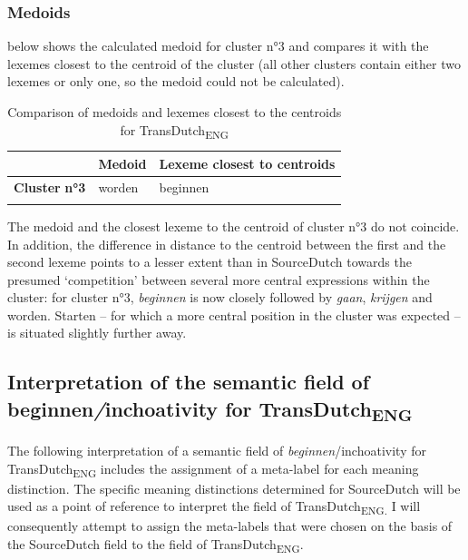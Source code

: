 \subsubsection{Medoids}
\label{sec:4.3.3.2}  
 below shows the calculated medoid for cluster n°3 and compares it with the lexemes closest to the centroid of the cluster (all other clusters contain either two lexemes or only one, so the medoid could not be calculated).

\begin{table}
\caption{\label{tab:4:15} Comparison of medoids and lexemes closest to the centroids for TransDutch\textsubscript{ENG}}
\begin{tabularx}{\textwidth}{XXl} 
\lsptoprule
& \textbf{Medoid} & \textbf{Lexeme} \textbf{closest} \textbf{to} \textbf{centroids}\\
\midrule
\textbf{Cluster} \textbf{n°3} & worden & beginnen\\
\lspbottomrule
\end{tabularx}
\end{table}

The medoid and the closest lexeme to the centroid of cluster n°3 do not coincide. In addition, the difference in distance to the centroid between the first and the second lexeme points to a lesser extent than in SourceDutch towards the presumed ‘competition’ between several more central expressions within the cluster: for cluster n°3, \textit{beginnen} is now closely followed by \textit{gaan}, \textit{krijgen} and worden. Starten – for which a more central position in the cluster was expected – is situated slightly further away.

\subsection{Interpretation of the semantic field of beginnen\textit{/}inchoativity for TransDutch\textsubscript{ENG}}
\label{sec:4.3.4}  
The following interpretation of a semantic field of \textit{beginnen}/inchoativity for TransDutch\textsubscript{ENG} includes the assignment of a meta-label for each meaning distinction. The specific meaning distinctions determined for SourceDutch will be used as a point of reference to interpret the field of TransDutch\textsubscript{ENG.} I will consequently attempt to assign the meta-labels that were chosen on the basis of the SourceDutch field to the field of TransDutch\textsubscript{ENG}.

